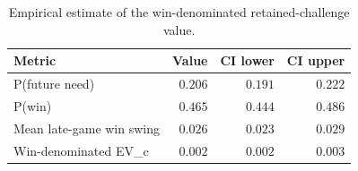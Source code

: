 \begin{table}[h]
\centering
\caption{Empirical estimate of the win-denominated retained-challenge value.}
\label{tab:evcwin}
\small
\begin{tabular}{lrrr}
\toprule
Metric & Value & CI lower & CI upper \\
\midrule
P(future need) & $0.206$ & $0.191$ & $0.222$ \\
P(win) & $0.465$ & $0.444$ & $0.486$ \\
Mean late-game win swing & $0.026$ & $0.023$ & $0.029$ \\
Win-denominated EV\_c & $0.002$ & $0.002$ & $0.003$ \\
\bottomrule
\end{tabular}
\end{table}
